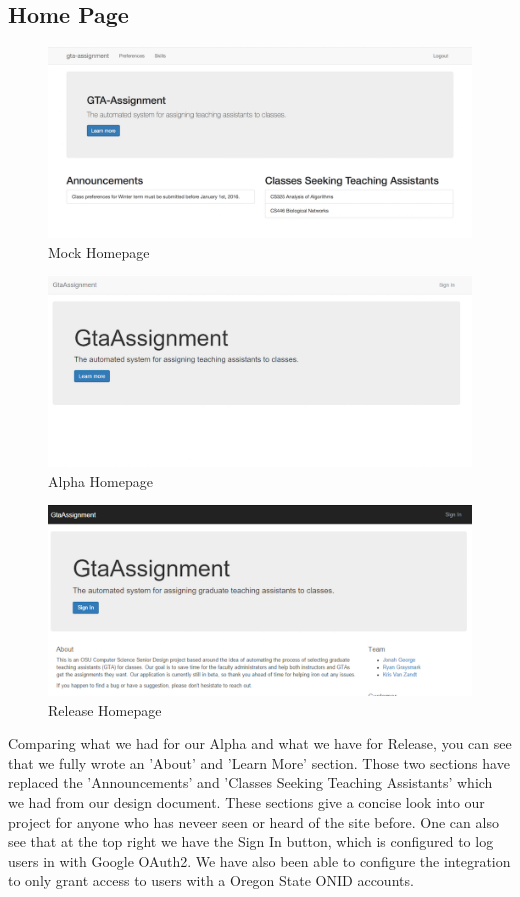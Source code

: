 \subsection{Home Page}

\begin{figure}[htbp]
  \centering
  \includegraphics[width=0.75\linewidth]{images/homepage-design.png}
  \caption{Mock Homepage}
\end{figure}

\begin{figure}[htbp]
  \centering
  \includegraphics[width=0.75\linewidth]{images/homepage-alpha.png}
  \caption{Alpha Homepage}
\end{figure}

\begin{figure}[htbp]
  \centering
  \includegraphics[width=0.75\linewidth]{images/homepage-beta.png}
  \caption{Release Homepage}
\end{figure}

Comparing what we had for our Alpha and what we have for Release, you can see that we fully wrote an 'About' and 'Learn More' section.
Those two sections have replaced the 'Announcements' and 'Classes Seeking Teaching Assistants' which we had from our design document.
These sections give a concise look into our project for anyone who has neveer seen or heard of the site before.
One can also see that at the top right we have the Sign In button, which is configured to log users in with Google OAuth2.
We have also been able to configure the integration to only grant access to users with a Oregon State ONID accounts.
